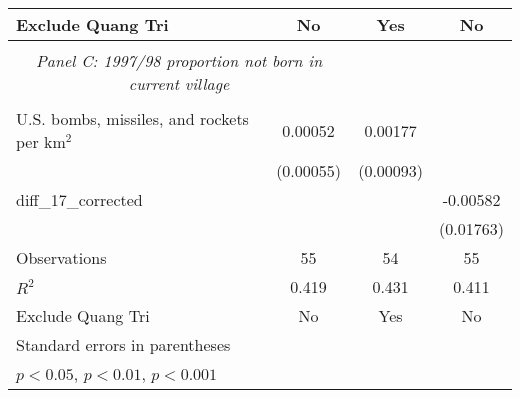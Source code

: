 \begin{table}[htbp]
\begin{tabular}{l*{3}{c}}
Exclude Quang Tri   &          No         &         Yes         &          No         \\
\hline \\ \multicolumn{2}{c}{\emph{Panel C: 1997/98 proportion not born in current village}} \\\\[-1ex]
U.S. bombs, missiles, and rockets per km$^2$&     0.00052         &     0.00177         &                     \\
                    &   (0.00055)         &   (0.00093)         &                     \\
[1em]
diff\_17\_corrected   &                     &                     &    -0.00582         \\
                    &                     &                     &   (0.01763)         \\
\hline
Observations        &          55         &          54         &          55         \\
\(R^{2}\)           &       0.419         &       0.431         &       0.411         \\
Exclude Quang Tri   &          No         &         Yes         &          No         \\
\hline\hline \multicolumn{5}{l}{\footnotesize Standard errors in parentheses}\\\multicolumn{3}{l}{\footnotesize \sym{*} \(p<0.05\), \sym{**} \(p<0.01\), \sym{***} \(p<0.001\)}\\ \end{tabular} \\ \end{table}
